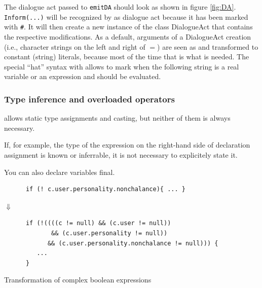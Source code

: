 The dialogue act passed to \texttt{emitDA} should look as shown in figure \ref{fig:DA}. \texttt{Inform}\verb|(...)| will be recognized by \vonda as dialogue act because it has been marked with \verb|#|. It will then create a new instance of the class DialogueAct that contains the respective modifications. As a default, arguments of a DialogueAct creation (i.e., character strings on the left and right of $=$) are seen as and transformed to constant (string) literals, because most of the time that is what is needed. The special ``hat'' syntax with \caret allows to mark when the following string is a real variable or an expression and should be evaluated.

\subsubsection{Type inference and overloaded operators}
\label{sec:typeinference}

%
\vonda allows static type assignments and casting, but neither of them is always necessary.


If, for example, the type of the expression on the right-hand side of declaration assignment is known or inferrable, it is not necessary to explicitely state it.

You can also declare variables final.

\begin{table}[htbp]
  \centering
  \begin{small}
    \begin{BVerbatim}
      if (! c.user.personality.nonchalance){ ... }
    \end{BVerbatim}

    {\Large$\Downarrow$}\\

    \begin{BVerbatim}
      if (!((((c != null) && (c.user != null))
             && (c.user.personality != null))
            && (c.user.personality.nonchalance != null))) {
         ...
      }
\end{BVerbatim}
\end{small}

\caption{Transformation of complex boolean expressions}
\label{tab:multi-predaccess}
\end{table}
\vspace*{10pt}

